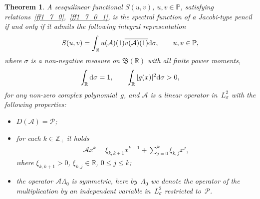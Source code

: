 \documentclass[pdftex]{sigma}
\numberwithin{equation}{section}
\newtheorem{Theorem}{Theorem}[section]
\begin{document}
\begin{Theorem}\label{tt2_1}A sesquilinear functional $S(u,v)$, $u,v\in\mathbb{P}$, satisfying relations~\eqref{ff1_7_0},~\eqref{ff1_7_0_1}, is the spectral function of a Jacobi-type pencil if and only if it admits the following integral representation
\begin{gather}\label{ff2_5}
S(u,v) = \int_{\mathbb{R}} u(\mathcal{A})(1) \overline{ v(\mathcal{A})(1) } {\rm d}\sigma,\qquad u,v\in\mathbb{P},
\end{gather}
where $\sigma$ is a non-negative measure on $\mathfrak{B}(\mathbb{R})$ with all finite power moments,
\begin{gather*} \int_\mathbb{R} {\rm d}\sigma = 1, \qquad \int_\mathbb{R} |g(x)|^2 {\rm d}\sigma > 0,
\end{gather*} for any non-zero complex polynomial~$g$, and $\mathcal{A}$ is a linear operator in~$L^2_\sigma$ with the following properties:
\begin{itemize}\itemsep=0pt
\item[$(i)$] $D(\mathcal{A}) = \mathcal{P}$;
\item[$(ii)$] for each $k\in\mathbb{Z}_+$ it holds
\begin{gather}\label{ff2_7}
\mathcal{A} x^k = \xi_{k,k+1} x^{k+1} + \sum_{j=0}^k \xi_{k,j} x^j,
\end{gather}
where $\xi_{k,k+1} > 0$, $\xi_{k,j}\in\mathbb{R}$, $0\leq j\leq k$;
\item[$(iii)$] the operator $\mathcal{A} \Lambda_0$ is symmetric, here by~$\Lambda_0$ we denote the operator of the multiplication by an independent variable in~$L^2_\sigma$ restricted to~$\mathcal{P}$.
\end{itemize}
\end{Theorem}
\end{document}
